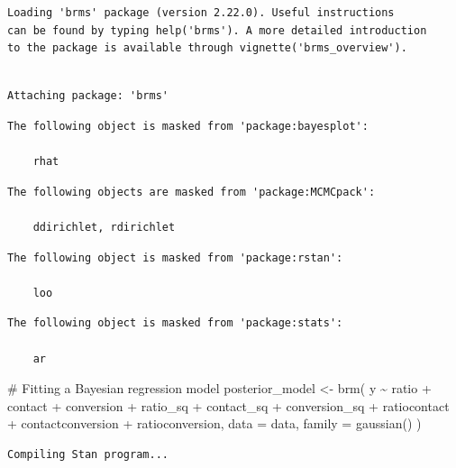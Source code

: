 \documentclass[
  10pt,
]{article}
\newenvironment{Shaded}{\begin{snugshade}}{\end{snugshade}}
\newcommand{\AttributeTok}[1]{\textcolor[rgb]{0.40,0.45,0.13}{#1}}
\newcommand{\CommentTok}[1]{\textcolor[rgb]{0.37,0.37,0.37}{#1}}
\newcommand{\FunctionTok}[1]{\textcolor[rgb]{0.28,0.35,0.67}{#1}}
\newcommand{\NormalTok}[1]{\textcolor[rgb]{0.00,0.23,0.31}{#1}}
\newcommand{\OtherTok}[1]{\textcolor[rgb]{0.00,0.23,0.31}{#1}}
\newcommand{\SpecialCharTok}[1]{\textcolor[rgb]{0.37,0.37,0.37}{#1}}
\begin{document}
\begin{verbatim}
Loading 'brms' package (version 2.22.0). Useful instructions
can be found by typing help('brms'). A more detailed introduction
to the package is available through vignette('brms_overview').
\end{verbatim}

\begin{verbatim}

Attaching package: 'brms'
\end{verbatim}

\begin{verbatim}
The following object is masked from 'package:bayesplot':

    rhat
\end{verbatim}

\begin{verbatim}
The following objects are masked from 'package:MCMCpack':

    ddirichlet, rdirichlet
\end{verbatim}

\begin{verbatim}
The following object is masked from 'package:rstan':

    loo
\end{verbatim}

\begin{verbatim}
The following object is masked from 'package:stats':

    ar
\end{verbatim}

\begin{Shaded}
\begin{Highlighting}[]
\CommentTok{\# Fitting a Bayesian regression model}
\NormalTok{posterior\_model }\OtherTok{\textless{}{-}} \FunctionTok{brm}\NormalTok{(}
\NormalTok{  y }\SpecialCharTok{\textasciitilde{}}\NormalTok{ ratio }\SpecialCharTok{+}\NormalTok{ contact }\SpecialCharTok{+}\NormalTok{ conversion }\SpecialCharTok{+}\NormalTok{ ratio\_sq }\SpecialCharTok{+}\NormalTok{ contact\_sq }\SpecialCharTok{+}\NormalTok{ conversion\_sq }\SpecialCharTok{+}
\NormalTok{    ratiocontact }\SpecialCharTok{+}\NormalTok{ contactconversion }\SpecialCharTok{+}\NormalTok{ ratioconversion,}
  \AttributeTok{data =}\NormalTok{ data,}
  \AttributeTok{family =} \FunctionTok{gaussian}\NormalTok{()}
\NormalTok{)}
\end{Highlighting}
\end{Shaded}

\begin{verbatim}
Compiling Stan program...
\end{verbatim}
\end{document}
